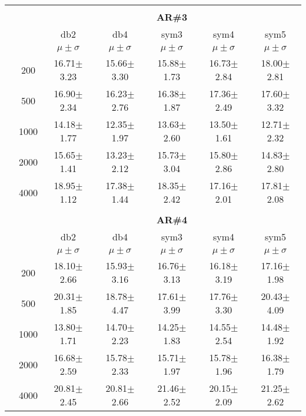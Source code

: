 \begin{table}[H]
\begin{tabular}{|c|c|c c c c c|}
\\ \midrule
\multicolumn{7}{c}{}\\ 



\cline{3-7}
\multicolumn{2}{c|}{\multirow{3}{*}{}} & \multicolumn{5}{c|}{\textbf{AR\#3}}   \\\cline{3-7} 

\multicolumn{2}{c|}{}  & db2 & db4 & sym3 & sym4 & sym5 \\\cline{3-7}
\multicolumn{2}{c|}{}& $\mu \pm \sigma$ & $\mu \pm \sigma$ & $\mu \pm \sigma$ & $\mu \pm \sigma$ & $\mu \pm \sigma$ \\\hline

\multicolumn{1}{|c|}{ \multirow{5}{*}{\rotatebox[origin=c]{90}{\textbf{Neurônios}}} }
&200	&16.71$\pm$3.23	&15.66$\pm$3.30	&15.88$\pm$1.73	&16.73$\pm$2.84	&18.00$\pm$2.81\\\cline{2-7}
&500	&16.90$\pm$2.34	&16.23$\pm$2.76	&16.38$\pm$1.87	&17.36$\pm$2.49	&17.60$\pm$3.32\\\cline{2-7}
&1000	&14.18$\pm$1.77	&12.35$\pm$1.97	&13.63$\pm$2.60	&13.50$\pm$1.61	&12.71$\pm$2.32\\\cline{2-7}
&2000	&15.65$\pm$1.41	&13.23$\pm$2.12 &15.73$\pm$3.04	&15.80$\pm$2.86	&14.83$\pm$2.80\\\cline{2-7}
&4000	&18.95$\pm$1.12	&17.38$\pm$1.44	&18.35$\pm$2.42	&17.16$\pm$2.01	&17.81$\pm$2.08


\\\midrule 
\multicolumn{7}{c}{}\\ 



\cline{3-7}
\multicolumn{2}{c|}{\multirow{3}{*}{}} & \multicolumn{5}{c|}{\textbf{AR\#4}}   \\\cline{3-7} 

\multicolumn{2}{c|}{}  & db2 & db4 & sym3 & sym4 & sym5 \\\cline{3-7}
\multicolumn{2}{c|}{}& $\mu \pm \sigma$ & $\mu \pm \sigma$ & $\mu \pm \sigma$ & $\mu \pm \sigma$ & $\mu \pm \sigma$ \\\hline

\multicolumn{1}{|c|}{ \multirow{5}{*}{\rotatebox[origin=c]{90}{\textbf{Neurônios}}} }
&200	&18.10$\pm$2.66	&15.93$\pm$3.16	&16.76$\pm$3.13	&16.18$\pm$3.19	&17.16$\pm$1.98\\\cline{2-7}
&500	&20.31$\pm$1.85	&18.78$\pm$4.47	&17.61$\pm$3.99	&17.76$\pm$3.30	&20.43$\pm$4.09\\\cline{2-7}
&1000	&13.80$\pm$1.71	&14.70$\pm$2.23	&14.25$\pm$1.83	&14.55$\pm$2.54	&14.48$\pm$1.92\\\cline{2-7}
&2000	&16.68$\pm$2.59	&15.78$\pm$2.33	&15.71$\pm$1.97	&15.78$\pm$1.96	&16.38$\pm$1.79\\\cline{2-7}
&4000	&20.81$\pm$2.45	&20.81$\pm$2.66	&21.46$\pm$2.52	&20.15$\pm$2.09	&21.25$\pm$2.62


\\\midrule
	\end{tabular}

\end{table}%

